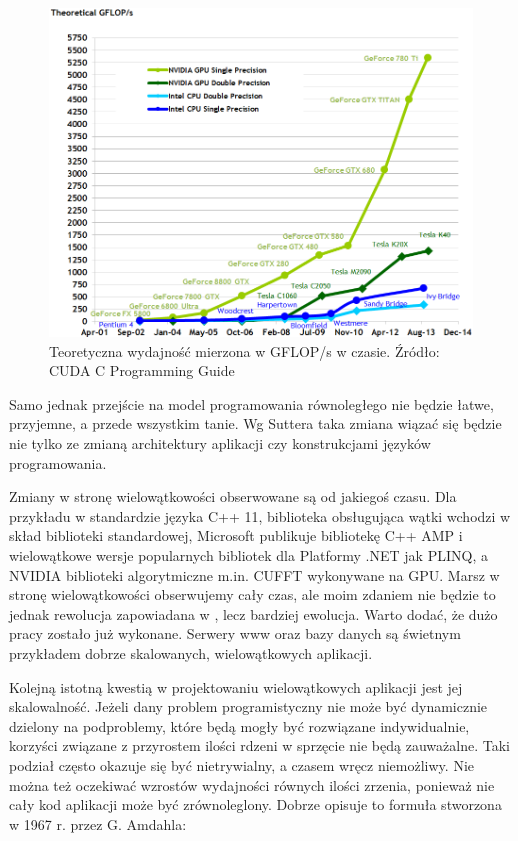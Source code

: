 \begin{figure}[ht]
\centering
\includegraphics[scale=0.4]{images/floating-point-operations-per-second.png}
\caption{Teoretyczna wydajność mierzona w GFLOP/s w czasie. Źródło: CUDA C Programming Guide}
\label{gflops}
\end{figure}

Samo jednak przejście na model programowania równoległego nie będzie łatwe,
przyjemne, a przede wszystkim tanie. Wg
Suttera taka zmiana wiązać się będzie nie tylko ze zmianą architektury
aplikacji czy konstrukcjami języków programowania. 

Zmiany w stronę wielowątkowości obserwowane są od jakiegoś czasu. Dla przykładu
w 
standardzie języka C++ 11, biblioteka obsługująca wątki wchodzi w skład
biblioteki standardowej, Microsoft publikuje bibliotekę C++ AMP i wielowątkowe
wersje popularnych bibliotek dla Platformy .NET jak PLINQ, a NVIDIA biblioteki
algorytmiczne m.in. CUFFT wykonywane na GPU. Marsz w stronę wielowątkowości
obserwujemy cały czas, ale moim zdaniem nie będzie to jednak rewolucja
zapowiadana w \cite{rewolucja}, lecz bardziej ewolucja. Warto dodać, że dużo
pracy zostało już wykonane.  Serwery www oraz bazy danych są świetnym przykładem
dobrze skalowanych, wielowątkowych aplikacji.

Kolejną istotną kwestią w projektowaniu wielowątkowych aplikacji jest jej
skalowalność. Jeżeli dany problem programistyczny nie może być
dynamicznie dzielony na podproblemy, które będą mogły być rozwiązane
indywidualnie, korzyści związane z przyrostem ilości rdzeni w sprzęcie nie będą
zauważalne. Taki podział często okazuje się być nietrywialny, a czasem
wręcz niemożliwy. Nie można też oczekiwać wzrostów wydajności równych ilości
zrzenia, ponieważ nie
cały kod aplikacji może być zrównoleglony. Dobrze opisuje to formuła stworzona w
1967 r. przez G. Amdahla:

